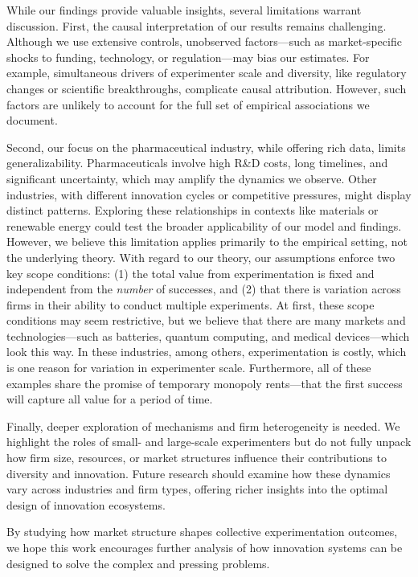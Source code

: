 While our findings provide valuable insights, several limitations warrant discussion. First, the causal interpretation of our results remains challenging. Although we use extensive controls, unobserved factors—such as market-specific shocks to funding, technology, or regulation—may bias our estimates. For example, simultaneous drivers of experimenter scale and diversity, like regulatory changes or scientific breakthroughs, complicate causal attribution. However, such factors are unlikely to account for the full set of empirical associations we document.

Second, our focus on the pharmaceutical industry, while offering rich data, limits generalizability. Pharmaceuticals involve high R\&D costs, long timelines, and significant uncertainty, which may amplify the dynamics we observe. Other industries, with different innovation cycles or competitive pressures, might display distinct patterns. Exploring these relationships in contexts like materials or renewable energy could test the broader applicability of our model and findings. However, we believe this limitation applies primarily to the empirical setting, not the underlying theory. With regard to our theory, our assumptions enforce two key scope conditions: (1) the total value from experimentation is fixed and independent from the \emph{number} of successes, and (2) that there is variation across firms in their ability to conduct multiple experiments. At first, these scope conditions may seem restrictive, but we believe that there are many markets and technologies---such as batteries, quantum computing, and medical devices---which look this way. In these industries, among others, experimentation is costly, which is one reason for variation in experimenter scale. Furthermore, all of these examples share the promise of temporary monopoly rents---that the first success will capture all value for a period of time.

Finally, deeper exploration of mechanisms and firm heterogeneity is needed. We highlight the roles of small- and large-scale experimenters but do not fully unpack how firm size, resources, or market structures influence their contributions to diversity and innovation. Future research should examine how these dynamics vary across industries and firm types, offering richer insights into the optimal design of innovation ecosystems.

By studying how market structure shapes collective experimentation outcomes, we hope this work encourages further analysis of how innovation systems can be designed to solve the complex and pressing problems.